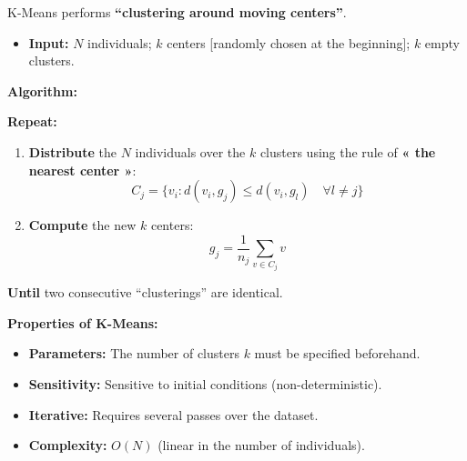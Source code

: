 \documentclass[10pt,a4paper]{article}
\begin{document}
\vspace{5pt}

\par\vspace{3pt}
K-Means performs \textbf{``clustering around moving centers''}.

\begin{itemize}[leftmargin=12pt, itemsep=1.5pt, topsep=1.5pt]
    \item \textbf{Input:} $N$ individuals; $k$ centers [randomly chosen at the beginning]; $k$ empty clusters.
\end{itemize}

\vspace{1pt}
\noindent\textbf{Algorithm:}
\begin{tcolorbox}[
    colframe=themeblue,
    colback=lightbg,
    arc=1.5mm,
    boxrule=0.5pt,
    left=6pt, right=6pt, top=3pt, bottom=3pt
]
\textbf{Repeat:}
\begin{enumerate}[leftmargin=14pt, itemsep=2pt, topsep=1pt]
    \item \textbf{Distribute} the $N$ individuals over the $k$ clusters using the rule of \textbf{« the nearest center »}:
    \[
    C_j = \big\{ v_i : d(v_i, g_j) \le d(v_i, g_l) \quad \forall l \ne j \big\}
    \]
    \item \textbf{Compute} the new $k$ centers:
    \[
    g_j = \frac{1}{n_j} \sum_{v \in C_j} v
    \]
\end{enumerate}
\textbf{Until} two consecutive ``clusterings'' are identical.
\end{tcolorbox}

\vspace{2pt}
\noindent\textbf{Properties of K-Means:}
\begin{itemize}[leftmargin=12pt, itemsep=2pt, topsep=1pt]
    \item \textbf{Parameters:} The number of clusters $k$ must be specified beforehand.
    \item \textbf{Sensitivity:} Sensitive to initial conditions (non-deterministic).
    \item \textbf{Iterative:} Requires several passes over the dataset.
    \item \textbf{Complexity:} $O(N)$ (linear in the number of individuals).
\end{itemize}

\clearpage

\end{document}
